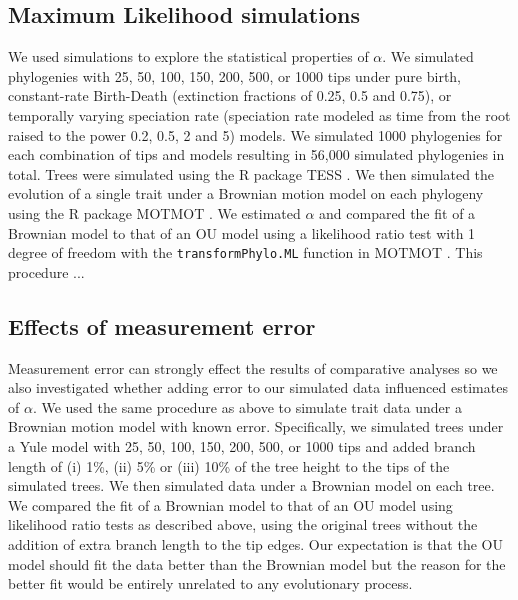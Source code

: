 \documentclass[a4paper,12pt]{article}
\begin{document}


  \subsection{Maximum Likelihood simulations}
  \label{section:sims.methods} 
    We used simulations to explore the statistical properties of $\alpha$. 
    We simulated phylogenies with 25, 50, 100, 150, 200, 500, or 1000 tips under pure birth, constant-rate Birth-Death (extinction fractions of 0.25, 0.5 and 0.75), or temporally varying speciation rate (speciation rate modeled as time from the root raised to the power 0.2, 0.5, 2 and 5) models. 
    We simulated 1000 phylogenies for each combination of tips and models resulting in 56,000 simulated phylogenies in total. 
    Trees were simulated using the R package TESS \cite{hohna2013fast}. 
    We then simulated the evolution of a single trait under a Brownian motion model on each phylogeny using the R package MOTMOT \citep{Thomas:2011aa}. 
    We estimated $\alpha$ and compared the fit of a Brownian model to that of an OU model using a likelihood ratio test with 1 degree of freedom with the \texttt{transformPhylo.ML} function in MOTMOT \citep{Thomas:2011aa}. 
    This procedure ... %

  \subsection{Effects of measurement error}
    Measurement error can strongly effect the results of comparative analyses \cite{silvestro2015} so we also investigated whether adding error to our simulated data influenced estimates of $\alpha$.
    We used the same procedure as above to simulate trait data under a Brownian motion model with known error. 
    Specifically, we simulated trees under a Yule model with 25, 50, 100, 150, 200, 500, or 1000 tips and added branch length of (i) 1\%, (ii) 5\% or (iii) 10\% of the tree height to the tips of the simulated trees. 
    We then simulated data under a Brownian model on each tree. 
    We compared the fit of a Brownian model to that of an OU model using likelihood ratio tests as described above, using the original trees without the addition of extra branch length to the tip edges. 
    Our expectation is that the OU model should fit the data better than the Brownian model but the reason for the better fit would be entirely unrelated to any evolutionary process. 
\end{document}
